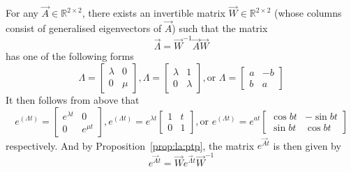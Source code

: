 \begin{proposition}
	For any $\vec A \in \mathbb R^{2 \times 2}$, there exists an invertible matrix $\vec W \in \mathbb R^{2 \times 2}$ (whose columns consist of generalised eigenvectors of $\vec A$) such that the matrix
	\begin{equation*}
		\vec \Lambda = \vec W^{-1} \vec A \vec W
	\end{equation*}
	has one of the following forms
	\begin{equation*}
		\Lambda =
			\begin{bmatrix}
				\lambda & 0 \\
				0 		& \mu
			\end{bmatrix},
		\Lambda = 
			\begin{bmatrix}
				\lambda & 1 \\
				0 		& \lambda
			\end{bmatrix}, \text{or }
		\Lambda = 
			\begin{bmatrix}
				a 	& -b \\
				b 	& a
			\end{bmatrix}
	\end{equation*}
	It then follows from above that
	\begin{equation*}
		e^{(\Lambda t)} =
			\begin{bmatrix}
				e^{\lambda t}	& 0 \\
				0 				& e^{\mu t}
			\end{bmatrix},
		e^{(\Lambda t)} = 
			e^{\lambda t}
			\begin{bmatrix}
				1 	& t \\
				0 	& 1
			\end{bmatrix}, \text{or }
		e^{(\Lambda t)} =
			e^{at}
			\begin{bmatrix}
				\cos{bt}	& -\sin{bt} \\
				\sin{bt}	& \cos{bt}
			\end{bmatrix}
	\end{equation*}
	respectively. And by Proposition~\ref{prop:la:ptp}, the matrix $e^{\vec At}$ is then given by
	\begin{equation*}
		e^{\vec At} = \vec W e^{\vec \Lambda t} \vec W^{-1}
	\end{equation*}
\end{proposition}